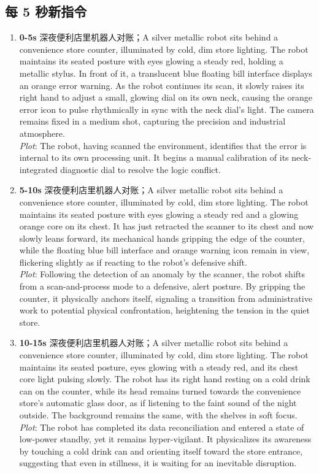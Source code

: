 \documentclass[11pt,a4paper]{article}
\begin{document}
\subsection*{每 5 秒新指令}
\begin{enumerate}
\item \textbf{0-5s} 深夜便利店里机器人对账；A silver metallic robot sits behind a convenience store counter, illuminated by cold, dim store lighting. The robot maintains its seated posture with eyes glowing a steady red, holding a metallic stylus. In front of it, a translucent blue floating bill interface displays an orange error warning. As the robot continues its scan, it slowly raises its right hand to adjust a small, glowing dial on its own neck, causing the orange error icon to pulse rhythmically in sync with the neck dial's light. The camera remains fixed in a medium shot, capturing the precision and industrial atmosphere.\\\newline \textit{Plot}: The robot, having scanned the environment, identifies that the error is internal to its own processing unit. It begins a manual calibration of its neck-integrated diagnostic dial to resolve the logic conflict.
\item \textbf{5-10s} 深夜便利店里机器人对账；A silver metallic robot sits behind a convenience store counter, illuminated by cold, dim store lighting. The robot maintains its seated posture with eyes glowing a steady red and a glowing orange core on its chest. It has just retracted the scanner to its chest and now slowly leans forward, its mechanical hands gripping the edge of the counter, while the floating blue bill interface and orange warning icon remain in view, flickering slightly as if reacting to the robot's defensive shift.\\\newline \textit{Plot}: Following the detection of an anomaly by the scanner, the robot shifts from a scan-and-process mode to a defensive, alert posture. By gripping the counter, it physically anchors itself, signaling a transition from administrative work to potential physical confrontation, heightening the tension in the quiet store.
\item \textbf{10-15s} 深夜便利店里机器人对账；A silver metallic robot sits behind a convenience store counter, illuminated by cold, dim store lighting. The robot maintains its seated posture, eyes glowing with a steady red, and its chest core light pulsing slowly. The robot has its right hand resting on a cold drink can on the counter, while its head remains turned towards the convenience store's automatic glass door, as if listening to the faint sound of the night outside. The background remains the same, with the shelves in soft focus.\\\newline \textit{Plot}: The robot has completed its data reconciliation and entered a state of low-power standby, yet it remains hyper-vigilant. It physicalizes its awareness by touching a cold drink can and orienting itself toward the store entrance, suggesting that even in stillness, it is waiting for an inevitable disruption.

\end{enumerate}
\end{document}
